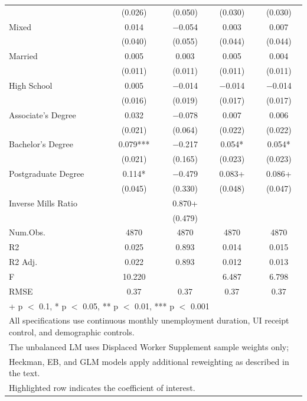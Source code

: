 \documentclass[
]{article}
\begin{document}
\begin{table}
{\begin{tabular}[t]{lcccc}
 & (\num{0.026}) & (\num{0.050}) & (\num{0.030}) & (\num{0.030})\\
Mixed & \num{0.014} & \num{-0.054} & \num{0.003} & \num{0.007}\\
 & (\num{0.040}) & (\num{0.055}) & (\num{0.044}) & (\num{0.044})\\
Married & \num{0.005} & \num{0.003} & \num{0.005} & \num{0.004}\\
 & (\num{0.011}) & (\num{0.011}) & (\num{0.011}) & (\num{0.011})\\
High
School & \num{0.005} & \num{-0.014} & \num{-0.014} & \num{-0.014}\\
 & (\num{0.016}) & (\num{0.019}) & (\num{0.017}) & (\num{0.017})\\
Associate's
Degree & \num{0.032} & \num{-0.078} & \num{0.007} & \num{0.006}\\
 & (\num{0.021}) & (\num{0.064}) & (\num{0.022}) & (\num{0.022})\\
Bachelor's
Degree & \num{0.079}*** & \num{-0.217} & \num{0.054}* & \num{0.054}*\\
 & (\num{0.021}) & (\num{0.165}) & (\num{0.023}) & (\num{0.023})\\
Postgraduate
Degree & \num{0.114}* & \num{-0.479} & \num{0.083}+ & \num{0.086}+\\
 & (\num{0.045}) & (\num{0.330}) & (\num{0.048}) & (\num{0.047})\\
Inverse
Mills
Ratio &  & \num{0.870}+ &  & \\
 &  & (\num{0.479}) &  & \\
\midrule
Num.Obs. & \num{4870} & \num{4870} & \num{4870} & \num{4870}\\
R2 & \num{0.025} & \num{0.893} & \num{0.014} & \num{0.015}\\
R2 Adj. & \num{0.022} & \num{0.893} & \num{0.012} & \num{0.013}\\
F & \num{10.220} &  & \num{6.487} & \num{6.798}\\
RMSE & \num{0.37} & \num{0.37} & \num{0.37} & \num{0.37}\\
\bottomrule
\multicolumn{5}{l}{\rule{0pt}{1em}+ p $<$ 0.1, * p $<$ 0.05, ** p $<$ 0.01, *** p $<$ 0.001}\\
\multicolumn{5}{l}{\rule{0pt}{1em}All specifications use continuous monthly unemployment duration, UI receipt control, and demographic controls.}\\
\multicolumn{5}{l}{\rule{0pt}{1em}The unbalanced LM uses Displaced Worker Supplement sample weights only;}\\
\multicolumn{5}{l}{\rule{0pt}{1em}Heckman, EB, and GLM models apply additional reweighting as described in the text.}\\
\multicolumn{5}{l}{\rule{0pt}{1em}Highlighted row indicates the coefficient of interest.}\\
\end{tabular}}
\end{table}
\end{document}

